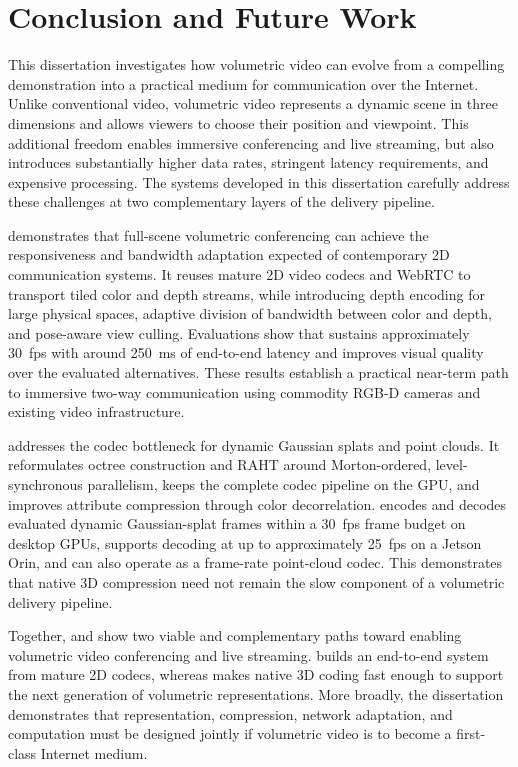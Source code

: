 \chapter{Conclusion and Future Work} 
\label{ch:conclusion}

This dissertation investigates how volumetric video can evolve from a compelling demonstration into a practical medium for communication over the Internet. 
%
Unlike conventional video, volumetric video represents a dynamic scene in three dimensions and allows viewers to choose their position and viewpoint. 
%
This additional freedom enables immersive conferencing and live streaming, but also introduces substantially higher data rates, stringent latency requirements, and expensive processing. 
%
The systems developed in this dissertation carefully address these challenges at two complementary layers of the delivery pipeline.

%
\livo demonstrates that full-scene volumetric conferencing can achieve the responsiveness and bandwidth adaptation expected of contemporary 2D communication systems. 
%
It reuses mature 2D video codecs and WebRTC to transport tiled color and depth streams, while introducing depth encoding for large physical spaces, adaptive division of bandwidth between color and depth, and pose-aware view culling. 
%
Evaluations show that \livo sustains approximately 30~fps with around 250~ms of end-to-end latency and improves visual quality over the evaluated alternatives. 
%
These results establish a practical near-term path to immersive two-way communication using commodity RGB-D cameras and existing video infrastructure.

%
\gsnfs addresses the codec bottleneck for dynamic Gaussian splats and point clouds. 
%
It reformulates octree construction and RAHT around Morton-ordered, level-synchronous parallelism, keeps the complete codec pipeline on the GPU, and improves attribute compression through color decorrelation. 
%
\gsnfs encodes and decodes evaluated dynamic Gaussian-splat frames within a 30~fps frame budget on desktop GPUs, supports decoding at up to approximately 25~fps on a Jetson Orin, and can also operate as a frame-rate point-cloud codec. 
%
This demonstrates that native 3D compression need not remain the slow component of a volumetric delivery pipeline.

Together, \livo and \gsnfs show two viable and complementary paths toward enabling volumetric video conferencing and live streaming. 
%
\livo builds an end-to-end system from mature 2D codecs, whereas \gsnfs makes native 3D coding fast enough to support the next generation of volumetric representations. 
%
More broadly, the dissertation demonstrates that representation, compression, network adaptation, and computation must be designed jointly if volumetric video is to become a first-class Internet medium.

